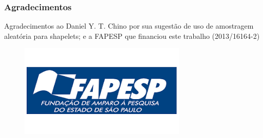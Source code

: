 \documentclass{beamer}
\begin{document}
\begin{frame}
\frametitle{Agradecimentos}
Agradecimentos ao Daniel Y. T. Chino por sua sugest{\~a}o de uso de amostragem aleat{\'o}ria para shapelets; e a FAPESP que financiou este trabalho (2013/16164-2)

\begin{figure}
\includegraphics[width=0.7\linewidth]{images/fapesp.png}
\end{figure}
\end{frame}

\end{document}
